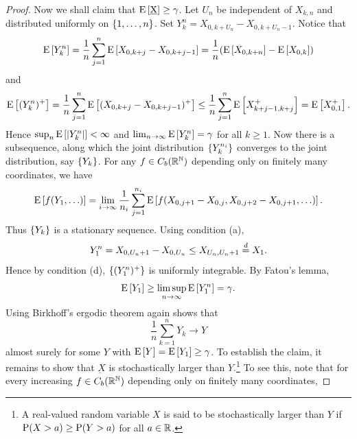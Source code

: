 \begin{proof}
    Now we shall claim that $\E\sbrc{\underbar{X}}\geq \gamma$. 
    Let $U_n$ be independent of $X_{k,n}$ and distributed 
    uniformly on $\set{1,\ldots,n}$. Set $Y^n_k = X_{0,k+U_n}-X_{0,k+U_n-1}$. 
    Notice that 
    \begin{equation*}
        \E\sbrc{Y^n_k} = \frac{1}{n}\sum_{j=1}^n\E\sbrc{X_{0,k+j}-X_{0,k+j-1}} 
        = \frac{1}{n}\pth{\E\sbrc{X_{0,k+n}} - \E\sbrc{X_{0,k}}}
    \end{equation*}
    and 
    \begin{equation*}
        \E\sbrc{(Y^n_k)^+} = \frac{1}{n}\sum_{j=1}^n\E\sbrc{(X_{0,k+j}-X_{0,k+j-1})^+} 
        \leq  \frac{1}{n}\sum_{j=1}^n\E\sbrc{X_{k+j-1,k+j}^+} = \E\sbrc{X_{0,1}^+}. 
    \end{equation*}
    Hence $\sup_{n}\E\sbrc{\abs{Y_k^n}}<\infty$ and 
    $\lim_{n\to\infty}\E\sbrc{Y_k^n} = \gamma$ for all $k\geq 1$. Now 
    there is a subsequence, along which the joint distribution $\set{Y_k^{n_i}}$ 
    converges to the joint distribution, say $\set{Y_k}$. For any $f\in C_b(\R^\N)$ 
    depending only on finitely many coordinates, we have 
    \begin{equation*}
        \E\sbrc{f(Y_1,\ldots)} 
        = \lim_{i\to\infty} \frac{1}{n_i}\sum_{j=1}^{n_i}\E\sbrc{f(X_{0,j+1}-X_{0,j}, X_{0,j+2} - X_{0,j+1},\ldots)}. 
    \end{equation*}  
    Thus $\set{Y_k}$ is a stationary sequence. Using condition (a), 
    \begin{equation*}
        Y^n_1 = X_{0,U_n+1} - X_{0,U_n} \leq X_{U_n,U_n+1} \deq X_1. 
    \end{equation*}
    Hence by condition (d), $\set{(Y^n_1)^+}$ is uniformly integrable. 
    By Fatou's lemma, 
    \begin{equation*}
        \E\sbrc{Y_1}\geq \limsup_{n\to\infty}\E\sbrc{Y_1^n} = \gamma. 
    \end{equation*}
    Using Birkhoff's ergodic theorem again shows that 
    \begin{equation*}
        \frac{1}{n}\sum_{k=1}^nY_k \to Y
    \end{equation*}
    almost surely for some $Y$ with $\E\sbrc{Y} = \E\sbrc{Y_1}\geq \gamma$. 
    To establish the claim, it remains to show that $\underbar{X}$ is 
    stochastically larger than $Y$.\footnote{A real-valued random variable 
    $X$ is said to be stochastically larger than $Y$ if $\P(X>a)\geq \P(Y>a)$ 
    for all $a\in\R$.} To see this, note that for every increasing $f\in C_b(\R^\N)$ 
    depending only on finitely many coordinates, 

\end{proof}
